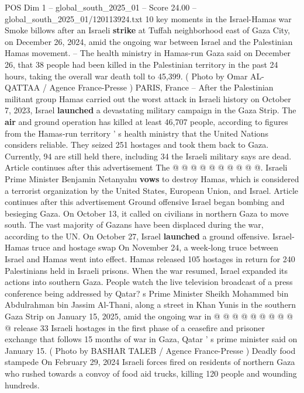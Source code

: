 \begin{textsample}{POS Dim 1 – global\_south\_2025\_01 – Score 24.00 – global\_south\_2025\_01/120113924.txt}  \label{ex:f1_pos_305}
10 key moments in the Israel-Hamas war Smoke billows after an Israeli \textbf{strike} at Tuffah neighborhood east of Gaza City, on December 26, 2024, amid the ongoing war between Israel and the Palestinian Hamas movement. -- The health ministry in Hamas-run Gaza said on December 26, that 38 people had been killed in the Palestinian territory in the past 24 hours, taking the overall war death toll to 45,399. ( Photo by Omar AL-QATTAA / Agence France-Presse ) PARIS, France -- After the Palestinian militant group Hamas carried out the worst attack in Israeli history on October 7, 2023, Israel \textbf{launched} a devastating military campaign in the Gaza Strip.
The \textbf{air} and ground operation has killed at least 46,707 people, according to figures from the Hamas-run territory ' s health ministry that the United Nations considers reliable.
They seized 251 hostages and took them back to Gaza.
Currently, 94 are still held there, including 34 the Israeli military says are dead.
Article continues after this advertisement The @ @ @ @ @ @ @ @ @ @.
Israeli Prime Minister Benjamin Netanyahu \textbf{vows} to destroy Hamas, which is considered a terrorist organization by the United States, European Union, and Israel.
Article continues after this advertisement Ground offensive Israel began bombing and besieging Gaza.
On October 13, it called on civilians in northern Gaza to move south.
The vast majority of Gazans have been displaced during the war, according to the UN.
On October 27, Israel \textbf{launched} a ground offensive.
Israel-Hamas truce and hostage swap On November 24, a week-long truce between Israel and Hamas went into effect.
Hamas released 105 hostages in return for 240 Palestinians held in Israeli prisons.
When the war resumed, Israel expanded its actions into southern Gaza.
People watch the live television broadcast of a press conference being addressed by Qatar? s Prime Minister Sheikh Mohammed bin Abdulrahman bin Jassim Al-Thani, along a street in Khan Yunis in the southern Gaza Strip on January 15, 2025, amid the ongoing war in @ @ @ @ @ @ @ @ @ @ release 33 Israeli hostages in the first phase of a ceasefire and prisoner exchange that follows 15 months of war in Gaza, Qatar ' s prime minister said on January 15. ( Photo by BASHAR TALEB / Agence France-Presse ) Deadly food stampede On February 29, 2024 Israeli forces fired on residents of northern Gaza who rushed towards a convoy of food aid trucks, killing 120 people and wounding hundreds.

\end{textsample}
